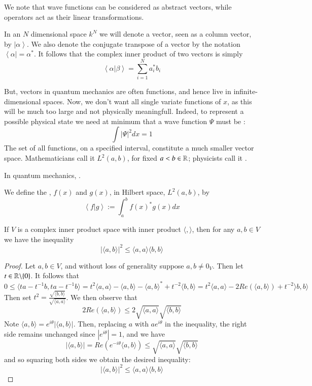 \documentclass[12pt, a4paper, oneside, openright, titlepage]{book}
\newcommand{\bra}[1]{\left\langle#1\right\vert}
\newcommand{\ket}[1]{\left\vert#1\right\rangle}
\newcommand{\braket}[2]{\left\langle#1\right\vert\left.#2\right\rangle}
\begin{document}
We note that wave functions can be considered as abstract vectors, while operators act as their linear transformations.

\begin{defn}
    In an $N$ dimensional space $k^N$ we will denote a vector, seen as a column vector, by $\ket{\alpha}$. We also denote the conjugate transpose of a vector by the notation $\bra{\alpha} = \alpha^*$. It follows that the complex inner product of two vectors is simply $$\braket{\alpha}{\beta} = \sum_{i=1}^Na_i^*b_i$$
\end{defn}

But, vectors in quantum mechanics are often functions, and hence live in infinite-dimensional spaces. Now, we don't want all single variate functions of $x$, as this will be much too large and not physically meaningfull. Indeed, to represent a possible physical state we need at minimum that a wave function $\Psi$ must be : $$\int|\Psi|^2dx = 1$$ The set of all  functions, on a specified interval, constitute a much smaller vector space. Mathematicians call it $L^2(a,b)$, for fixed $a<b \in \mathbb R$; physicists call it . 
\begin{rmk}
    In quantum mechanics, .
\end{rmk}

\begin{defn}
    We define the , $f(x)$ and $g(x)$, in Hilbert space, $L^2(a,b)$, by $$\braket{f}{g} := \int_a^bf(x)^*g(x)dx$$
\end{defn}

\begin{thm}
    If $V$ is a complex inner product space with inner product $\langle,\rangle$, then for any $a,b \in V$ we have the inequality $$|\langle a,b\rangle|^2 \leq \langle a,a\rangle\langle b,b\rangle$$
\end{thm}
\begin{proof}
    Let $a,b \in V$, and without loss of generality suppose $a, b \neq 0_V$. Then let $t \in \mathbb R\backslash\{0\}$. It follows that $$0 \leq \langle ta-t^{-1}b,ta-t^{-1}b\rangle = t^2\langle a,a\rangle - \langle a,b\rangle - \langle a,b\rangle^* + t^{-2}\langle b,b\rangle = t^2\langle a,a\rangle - 2Re(\langle a,b\rangle)+t^{-2}\rangle b,b\rangle$$ Then set $t^2 = \frac{\sqrt{\langle b,b\rangle}}{\sqrt{\langle a,a\rangle}}$. We then observe that $$2Re(\langle a,b\rangle) \leq 2\sqrt{\langle a,a\rangle}\sqrt{\langle b,b\rangle}$$ Note $\langle a,b\rangle = e^{i\theta}|\langle a,b\rangle|$. Then, replacing $a$ with $ae^{i\theta}$ in the inequality, the right side remains unchanged since $|e^{i\theta}| = 1$, and we have $$|\langle a,b\rangle| = Re(e^{-i\theta}\langle a,b\rangle) \leq \sqrt{\langle a,a\rangle}\sqrt{\langle b,b\rangle}$$ and so squaring both sides we obtain the desired inequality: $$|\langle a,b\rangle|^2 \leq \langle a,a\rangle \langle b,b\rangle$$
\end{proof}
\end{document}
